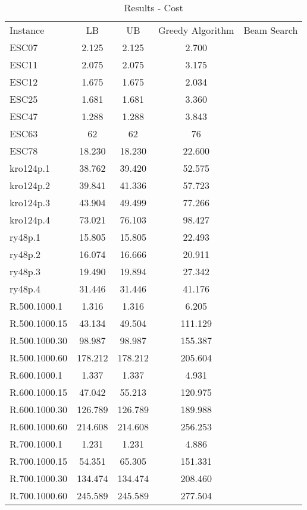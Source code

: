 \documentclass[]{article}
\begin{document}
    \begin{table}[htb]
		\begin{tabular}{lcccc}
			Instance & LB & UB & Greedy Algorithm & Beam Search \\
			ESC07 & 2.125 & 2.125 & 2.700 & \\
			ESC11 & 2.075 & 2.075 & 3.175 & \\
			ESC12 & 1.675 & 1.675 & 2.034 & \\
			ESC25 & 1.681 & 1.681 & 3.360 & \\
			ESC47 & 1.288 & 1.288 & 3.843 & \\
			ESC63 & 62	  & 62    & 76 & \\
			ESC78 & 18.230 & 18.230 & 22.600 & \\
			kro124p.1 & 38.762 & 39.420 & 52.575 & \\
			kro124p.2 & 39.841 & 41.336 & 57.723 & \\
			kro124p.3 & 43.904 & 49.499 & 77.266 & \\
			kro124p.4 & 73.021 & 76.103 & 98.427 & \\
			ry48p.1   & 15.805 & 15.805 & 22.493 & \\
			ry48p.2   & 16.074 & 16.666 & 20.911 & \\
			ry48p.3   & 19.490 & 19.894 & 27.342 & \\
			ry48p.4   & 31.446 & 31.446 & 41.176 & \\
			R.500.1000.1  & 1.316   & 1.316 & 6.205 & \\
			R.500.1000.15 & 43.134  & 49.504 & 111.129 & \\
			R.500.1000.30 & 98.987  & 98.987 & 155.387 & \\
			R.500.1000.60 & 178.212 & 178.212 & 205.604 & \\
			R.600.1000.1  & 1.337   & 1.337 & 4.931 & \\
			R.600.1000.15 & 47.042  & 55.213 & 120.975 & \\
			R.600.1000.30 & 126.789 & 126.789 & 189.988 & \\
			R.600.1000.60 & 214.608 & 214.608 & 256.253 & \\
			R.700.1000.1  & 1.231   & 1.231 & 4.886 & \\
			R.700.1000.15 & 54.351  & 65.305 & 151.331 & \\
			R.700.1000.30 & 134.474 & 134.474 & 208.460 & \\
			R.700.1000.60 & 245.589 & 245.589 & 277.504 & \\
		\end{tabular}
		\caption{Results - Cost}
		\label{table:results_cost}
	\end{table}
\end{document}
